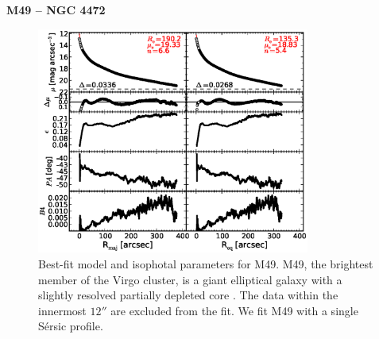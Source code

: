 \documentclass[preprint2]{emulateapj}
\newcommand{\fitfigurewidth}{0.8\textwidth}
\begin{document}
  \clearpage\newpage\noindent
  {\bf M49 -- NGC 4472 \\}
  
  \begin{figure}[h]
  \begin{center}
  \includegraphics[width=\fitfigurewidth]{images/m49_1Dfit.eps}
  \caption{Best-fit model and isophotal parameters for M49.
  M49, the brightest member of the Virgo cluster, is a giant elliptical galaxy 
  with a slightly resolved partially depleted core \citep{rusli2013}.  %
  The data within the innermost $12''$ are excluded from the fit.
  We fit M49 with a single S\'ersic profile. 
  }
  \end{center}
  \end{figure}
\end{document}
